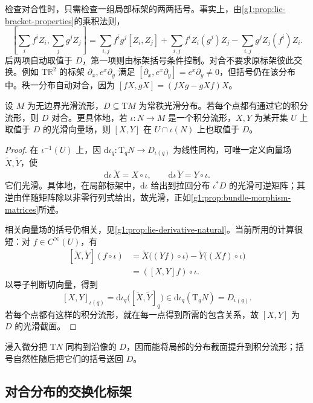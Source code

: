 检查对合性时，只需检查一组局部标架的两两括号。事实上，由\cref{g1:prop:lie-bracket-properties}的乘积法则，
\[
	\left[\sum_i f^iZ_i,\sum_j g^jZ_j\right]
	=\sum_{i,j}f^ig^j[Z_i,Z_j]
	+\sum_{i,j}f^iZ_i(g^j)Z_j
	-\sum_{i,j}g^jZ_j(f^i)Z_i.
\]
后两项自动取值于 \(D\)，第一项则由标架括号条件控制。对合不要求原标架彼此交换。例如 \(\mathrm{T}\mathbb R^2\) 的标架 \(\partial_x,e^x\partial_y\) 满足 \([\partial_x,e^x\partial_y]=e^x\partial_y\ne0\)，但括号仍在该分布中。秩一分布自动对合，因为 \([fX,gX]=(fXg-gXf)X\)。

\begin{proposition}\label{g1:prop:involutivity-necessary}
	设 \(M\) 为无边界光滑流形，\(D\subseteq \mathrm{T}M\) 为常秩光滑分布。若每个点都有通过它的积分流形，则 \(D\) 对合。更具体地，若 \(\iota:N\to M\) 是一个积分流形，\(X,Y\) 为某开集 \(U\) 上取值于 \(D\) 的光滑向量场，则 \([X,Y]\) 在 \(U\cap\iota(N)\) 上也取值于 \(D\)。
\end{proposition}
\begin{proof}
	在 \(\iota^{-1}(U)\) 上，因 \(\mathrm{d}\iota_q:\mathrm{T}_qN\to D_{\iota(q)}\) 为线性同构，可唯一定义向量场 \(\widetilde X,\widetilde Y\)，使
	\[
		\mathrm{d}\iota\,\widetilde X=X\circ\iota,\qquad
		\mathrm{d}\iota\,\widetilde Y=Y\circ\iota.
	\]
	它们光滑。具体地，在局部标架中，\(\mathrm{d}\iota\) 给出到拉回分布 \(\iota^*D\) 的光滑可逆矩阵；其逆由伴随矩阵除以非零行列式给出，故光滑，正如\cref{g1:prop:bundle-morphism-matrices}所述。

	相关向量场的括号仍相关，见\cref{g1:prop:lie-derivative-natural}。当前所用的计算很短：对 \(f\in C^\infty(U)\)，有
	\[
		\begin{aligned}
			[\widetilde X,\widetilde Y](f\circ\iota)
			&=\widetilde X\bigl((Yf)\circ\iota\bigr)-\widetilde Y\bigl((Xf)\circ\iota\bigr)\\
			&=([X,Y]f)\circ\iota.
		\end{aligned}
	\]
	以导子判断切向量，得到
	\[
		[X,Y]_{\iota(q)}
		=\mathrm{d}\iota_q\bigl([\widetilde X,\widetilde Y]_q\bigr)
		\in \mathrm{d}\iota_q(\mathrm{T}_qN)=D_{\iota(q)}.
	\]
	若每个点都有这样的积分流形，就在每一点得到所需的包含关系，故 \([X,Y]\) 为 \(D\) 的光滑截面。
\end{proof}

浸入微分把 \(\mathrm{T}N\) 同构到沿像的 \(D\)，因而能将局部的分布截面提升到积分流形；括号自然性随后把它们的括号送回 \(D\)。

\subsection{对合分布的交换化标架}
\label{g1:subsec:1304:03}

